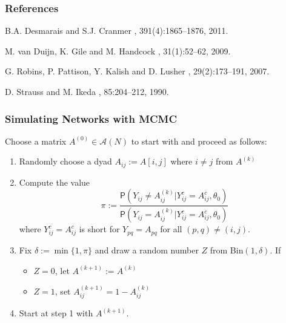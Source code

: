 \documentclass[xcolor=dvipsnames]{beamer}
\begin{document}
\begin{frame}%
  \frametitle{References}    
  \begin{thebibliography}{10}    
  \beamertemplatearticlebibitems
    B.A. Desmarais and S.J. Cranmer
    , 391(4):1865--1876, 2011.
    
  \beamertemplatearticlebibitems
    M. van Duijn, K. Gile and M. Handcock
    , 31(1):52--62, 2009.
    
\beamertemplatearticlebibitems
    G. Robins, P. Pattison, Y. Kalish and D. Lusher
    , 29(2):173--191, 2007.    
    
    \beamertemplatearticlebibitems
    D. Strauss and M. Ikeda
    , 85:204--212, 1990.
  \end{thebibliography}
\end{frame}

\begin{frame}
\frametitle{Simulating Networks with MCMC}
Choose a matrix $A^{(0)} \in \mathcal{A}(N)$ to start with and proceed as follows:\\
\begin{enumerate}
\item Randomly choose a dyad $A_{ij}:=A[i,j]$ where $i \neq j$ from $A^{(k)}$
\item Compute the value
$$\pi := \dfrac{\mathsf{P}(Y_{ij} \neq A_{ij}^{(k)} | Y_{ij}^c=A_{ij}^c, \theta_0)}{\mathsf{P}(Y_{ij}= A_{ij}^{(k)} | Y_{ij}^c=A_{ij}^c, \theta_0)}$$%
where $Y_{ij}^c=A_{ij}^c$ is short for $Y_{pq}=A_{pq}$ for all $(p,q)\neq (i,j)$.\\[0.2cm]
\item Fix $\delta:= \min\{1, \pi\}$ and draw a random number $Z$ from Bin$(1, \delta)$. If \\[0.2cm]
\begin{itemize}
\item $Z=0$, let $A^{(k+1)} := A^{(k)}$ \\[0.2cm]
\item $Z=1$, set $A_{ij}^{(k+1)}=1- A_{ij}^{(k)}$
\end{itemize}
\item Start at step 1 with $A^{(k+1)}$.
\end{enumerate}


\end{frame}
\end{document}
